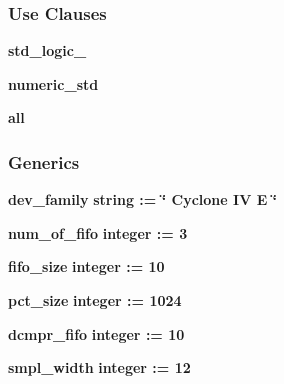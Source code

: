\subsubsection*{Use Clauses}
 \begin{DoxyCompactItemize}
\item 
{\bf std\+\_\+logic\+\_}   
\item 
{\bf numeric\+\_\+std}   
\item 
{\bf  all }   
\end{DoxyCompactItemize}
\subsubsection*{Generics}
 \begin{DoxyCompactItemize}
\item 
{\bf dev\+\_\+family} {\bfseries {\bfseries \textcolor{comment}{string}\textcolor{vhdlchar}{ }\textcolor{vhdlchar}{ }\textcolor{vhdlchar}{\+:}\textcolor{vhdlchar}{=}\textcolor{vhdlchar}{ }\textcolor{vhdlchar}{ }\textcolor{vhdlchar}{ }\textcolor{vhdlchar}{ }\textcolor{keyword}{\char`\"{} Cyclone I\+V E \char`\"{}}\textcolor{vhdlchar}{ }}}
\item 
{\bf num\+\_\+of\+\_\+fifo} {\bfseries {\bfseries \textcolor{comment}{integer}\textcolor{vhdlchar}{ }\textcolor{vhdlchar}{ }\textcolor{vhdlchar}{\+:}\textcolor{vhdlchar}{=}\textcolor{vhdlchar}{ }\textcolor{vhdlchar}{ } \textcolor{vhdldigit}{3} \textcolor{vhdlchar}{ }}}
\item 
{\bf fifo\+\_\+size} {\bfseries {\bfseries \textcolor{comment}{integer}\textcolor{vhdlchar}{ }\textcolor{vhdlchar}{ }\textcolor{vhdlchar}{\+:}\textcolor{vhdlchar}{=}\textcolor{vhdlchar}{ }\textcolor{vhdlchar}{ } \textcolor{vhdldigit}{10} \textcolor{vhdlchar}{ }}}
\item 
{\bf pct\+\_\+size} {\bfseries {\bfseries \textcolor{comment}{integer}\textcolor{vhdlchar}{ }\textcolor{vhdlchar}{ }\textcolor{vhdlchar}{\+:}\textcolor{vhdlchar}{=}\textcolor{vhdlchar}{ }\textcolor{vhdlchar}{ } \textcolor{vhdldigit}{1024} \textcolor{vhdlchar}{ }}}
\item 
{\bf dcmpr\+\_\+fifo} {\bfseries {\bfseries \textcolor{comment}{integer}\textcolor{vhdlchar}{ }\textcolor{vhdlchar}{ }\textcolor{vhdlchar}{\+:}\textcolor{vhdlchar}{=}\textcolor{vhdlchar}{ }\textcolor{vhdlchar}{ } \textcolor{vhdldigit}{10} \textcolor{vhdlchar}{ }}}
\item 
{\bf smpl\+\_\+width} {\bfseries {\bfseries \textcolor{comment}{integer}\textcolor{vhdlchar}{ }\textcolor{vhdlchar}{ }\textcolor{vhdlchar}{\+:}\textcolor{vhdlchar}{=}\textcolor{vhdlchar}{ }\textcolor{vhdlchar}{ } \textcolor{vhdldigit}{12} \textcolor{vhdlchar}{ }}}
\end{DoxyCompactItemize}
